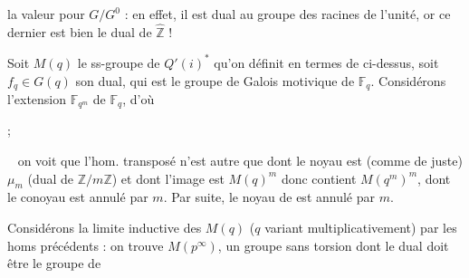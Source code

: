 la valeur  pour  $G/G^0$ :  en effet, il est dual au groupe des racines de l'unité, or ce dernier est bien le dual de $\widehat{\mathbb Z}$ !


Soit $M(q)$ le ss-groupe de $Q'(i)^*$ qu'on définit en termes de  ci-dessus, soit  $f_q\in G(q)$ son dual, qui est le groupe de Galois motivique de $\mathbb F_q$. Considérons l'extension $\mathbb F_{q^m}$ de $\mathbb F_q$, d'où


;

\  on voit que l'hom. transposé n'est autre que
dont le noyau est (comme de juste) \deleted{\unsure{$\mu$}} $\mu_m$ (dual de $\mathbb Z/m\mathbb Z$) et dont l'image est $M(q)^m$ donc contient $M(q^m)^m$, dont le conoyau est annulé par $m$. Par suite, le  noyau de \unsure{$\varphi$} est annulé par $m$.

 Considérons la limite inductive des $M(q)$ ($q$ variant multiplicativement) par les homs précédents : on trouve $M(p^\infty)$, un groupe sans torsion dont le dual doit être le groupe de

